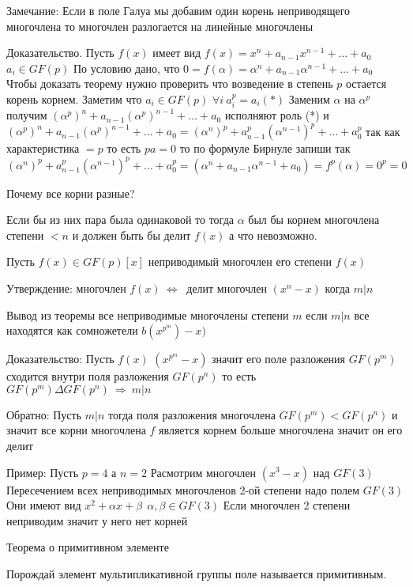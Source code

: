 Замечание: Если в поле Галуа мы добавим один корень неприводящего многочлена то
многочлен разлогается на линейные многочлены

Доказательство. Пусть $f(x)$ имеет вид $f(x) = x^n + a_{n-1}x^{n-1} + \ldots +
a_0$ $a_i \in GF(p)$ По условию дано, что $0 = f(\alpha) = \alpha^n +
a_{n-1}\alpha^{n-1} + \ldots + a_0$ Чтобы доказать теорему нужно проверить что
возведение в степень $p$ остается корень корнем. Заметим что $a_i \in GF(p)$
$\forall i ~ a_i^p = a_i (*)$ Заменим $\alpha$ на $\alpha^p$ получим
$(\alpha^p)^n + a_{n-1}(\alpha^p)^{n-1} + \ldots + a_0$ исполняют роль (*) и
$(\alpha^p)^n + a_{n-1}(\alpha^p)^{n-1} + \ldots + a_0 = (\alpha^n)^p +
a^p_{n-1}(\alpha^{n-1})^p + \ldots + a_0^p$ так как характеристика $=p$ то есть
$pa = 0$ то по формуле Бирнуле запиши так $(\alpha^n)^p + a^p_{n-1}
(\alpha^{n-1})^p + \ldots + a_0^p = (\alpha^n + a_{n-1}\alpha^{n-1} + a_0) =
f^p(\alpha) = 0^p = 0$

Почему все корни разные?

Если бы из них пара была одинаковой то тогда $\alpha$ был бы корнем многочлена
степени $<n$ и должен быть бы делит $f(x)$ а что невозможно.

\begin{theorem}
  Пусть $f(x) \in GF(p)[x]$ неприводимый многочлен его степени $f(x)$
\end{theorem}

Утверждение: многочлен $f(x) ~ \Leftrightarrow ~$ делит многочлен $(x^{n} -x)$
когда $m|n$

Вывод из теоремы все неприводимые многочлены степени $m$ если $m|n$ все
находятся как сомножетели $b(x^{p^m}) -x)$

Доказательство: Пусть $f(x)$ $(x^{p^m} - x)$ значит его поле разложения
$GF(p^m)$ сходится внутри поля разложения $GF(p^n)$ то есть
$GF(p^m) \Delta GF(p^n) ~ \Rightarrow ~ m|n$

Обратно: Пусть $m|n$ тогда поля разложения многочлена $GF(p^m) < GF(p^n)$ и
значит все корни многочлена $f$ является корнем больше многочлена значит он его
делит

Пример: Пусть $p=4$ а $n=2$ Расмотрим многочлен $(x^3 - x)$ над $GF(3)$
Пересечением всех неприводимых многочленов 2-ой степени надо полем $GF(3)$
Они имеют вид $x^2 + \alpha x+ \beta ~~ \alpha, \beta \in GF(3)$ Если
многочлен 2 степени неприводим значит у него нет корней

Теорема о примитивном элементе

Порождай элемент мультипликативной группы поле называется примитивным.


